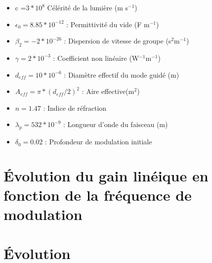 \documentclass[a4paper,12pt,titlepage]{article}
\begin{document}
        \begin{itemize}
            \item c =$ 3*10^8 $                    Célérité de la lumière (m s$^{-1}$)
            \item $\epsilon_0 = 8.85 * 10^{-12}$ :   Permittivité du vide (F m$^{-1}$)
            \item $\beta_2 = -2 * 10^{-26}$ :       Dispersion de vitesse de groupe (s$^2$m$^{-1}$)
            \item $\gamma = 2*10^{-3}$ :            Coefficient non linéaire (W$^{-1}$m$^{-1}$)
            \item $d_{eff} = 10*10^{-6}$ :           Diamètre effectif du mode guidé (m)
            \item $A_{eff} = \pi*(d_{eff}/2)^2$ :       Aire effective(m$^2$)
            \item $n = 1.47$ :                     Indice de réfraction
            \item $\lambda_p = 532 * 10^{-9}$ :    Longueur d'onde du faisceau (m)
            \item $\delta_0 = 0.02$ :              Profondeur de modulation initiale
        \end{itemize}
        
    \section{Évolution du gain linéique en fonction de la fréquence de modulation}
    
    \section{Évolution }
\end{document}
